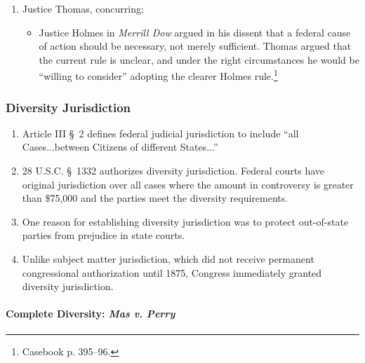 \begin{enumerate}
\begin{itemize}
        \item The Court saw the absence of a federal cause of action ``not as a missing federal door key, always required, but as a missing welcome mat, required in the circumstances...''\footnote{Casebook p. 394.}
        \item Affirmed.
    \end{itemize}
    \item Justice Thomas, concurring:
    \begin{itemize}
        \item Justice Holmes in \emph{Merrill Dow} argued in his dissent that a federal cause of action should be necessary, not merely sufficient. Thomas argued that the current rule is unclear, and under the right circumstances he would be ``willing to consider'' adopting the clearer Holmes rule.\footnote{Casebook p. 395--96.}
    \end{itemize}
\end{enumerate}

\subsubsection{Diversity Jurisdiction}

\begin{enumerate}
    \item Article III \S\ 2 defines federal judicial jurisdiction to include ``all Cases...between Citizens of different States...''
    \item 28 U.S.C. \S\ 1332 authorizes diversity jurisdiction. Federal courts have original jurisdiction over all cases where the amount in controversy is greater than \$75,000 and the parties meet the diversity requirements.
    \item One reason for establishing diversity jurisdiction was to protect out-of-state parties from prejudice in state courts.
    \item Unlike subject matter jurisdiction, which did not receive permanent congressional authorization until 1875, Congress immediately granted diversity jurisdiction.
\end{enumerate}

\paragraph{Complete Diversity: \emph{Mas v. Perry}}

